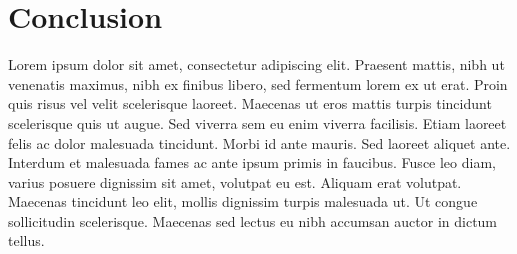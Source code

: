 \documentclass{article}
\theoremstyle{definition}
\begin{document}

\section{Conclusion}\label{ssec:conclusion}

Lorem ipsum dolor sit amet, consectetur adipiscing elit. Praesent mattis, nibh ut venenatis maximus, nibh ex finibus libero, sed fermentum lorem ex ut erat. Proin quis risus vel velit scelerisque laoreet. Maecenas ut eros mattis turpis tincidunt scelerisque quis ut augue. Sed viverra sem eu enim viverra facilisis. Etiam laoreet felis ac dolor malesuada tincidunt. Morbi id ante mauris. Sed laoreet aliquet ante. Interdum et malesuada fames ac ante ipsum primis in faucibus. Fusce leo diam, varius posuere dignissim sit amet, volutpat eu est. Aliquam erat volutpat. Maecenas tincidunt leo elit, mollis dignissim turpis malesuada ut. Ut congue sollicitudin scelerisque. Maecenas sed lectus eu nibh accumsan auctor in dictum tellus.

\nocite{*}
\printbibliography
\end{document}
